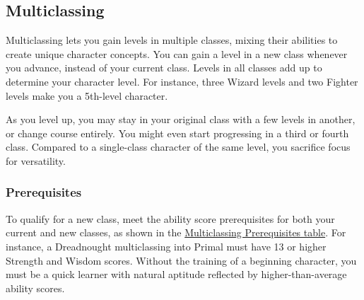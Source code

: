 \subsection{Multiclassing}\label{_multiclassing}

Multiclassing lets you gain levels in multiple classes, mixing their
abilities to create unique character concepts. You can gain a level in a
new class whenever you advance, instead of your current class. Levels in
all classes add up to determine your character level. For instance,
three Wizard levels and two Fighter levels make you a 5th-level
character.

As you level up, you may stay in your original class with a few levels
in another, or change course entirely. You might even start progressing
in a third or fourth class. Compared to a single-class character of the
same level, you sacrifice focus for versatility.

\subsubsection{Prerequisites}\label{_prerequisites}

To qualify for a new class, meet the ability score prerequisites for
both your current and new classes, as shown in the
\hyperref[multiclassing-prerequisites-table]{Multiclassing Prerequisites
table}. For instance, a Dreadnought multiclassing into Primal must have
13 or higher Strength and Wisdom scores. Without the training of a
beginning character, you must be a quick learner with natural aptitude
reflected by higher-than-average ability scores.

